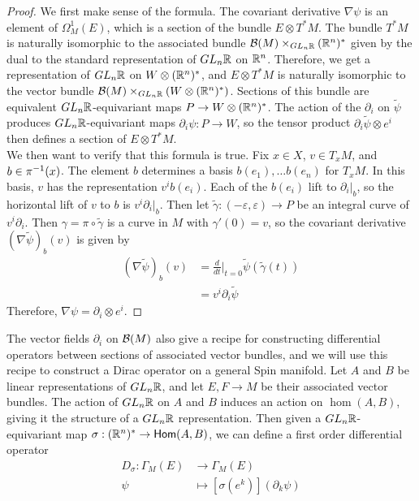 %
\begin{proof}
 We first make sense of the formula. The covariant derivative $\nabla\psi$ is
 an element of $\Omega_M^1(E)$, which is a section of the bundle $E \otimes T^*M$.
 The bundle $T^*M$ is naturally isomorphic to the associated bundle
 $\mathcal{B}(M) \times_{GL_n\mathbb{R}} (\mathbb{R}^n)^*$ given by the dual to the standard representation
 of $GL_n\mathbb{R}$ on $\mathbb{R}^n$. Therefore, we get a representation of $GL_n\mathbb{R}$ on
 $W \otimes (\mathbb{R}^n)^*$, and $E \otimes T^*M$ is naturally isomorphic to the vector
 bundle $\mathcal{B}(M) \times_{GL_n\mathbb{R}} (W \otimes (\mathbb{R}^n)^*)$. Sections of this bundle
 are equivalent $GL_n\mathbb{R}$-equivariant maps $P \to W \otimes (\mathbb{R}^n)^*$. The action
 of the $\partial_i$ on $\tilde{\psi}$ produces $GL_n\mathbb{R}$-equivariant maps
 $\partial_i\psi : P \to W$, so the tensor product
 $\partial_i\tilde{\psi} \otimes e^i$ then defines a section of $E \otimes T^*M$. \\

 We then want to verify that this formula is true. Fix $x \in X$, $v \in T_xM$,
 and $b \in \pi^{-1}(x)$. The element $b$ determines a basis $b(e_1), \ldots b(e_n)$
 for $T_xM$. In this basis, $v$ has the representation $v^ib(e_i)$. Each
 of the $b(e_i)$ lift to $\partial_i\vert_b$, so the horizontal lift of $v$ to $b$
 is $v^i\partial_i\vert_b$. Then let
 $\tilde{\gamma} : (-\varepsilon, \varepsilon) \to P$ be an integral curve of
 $v^i\partial_i$. Then $\gamma = \pi \circ \tilde{\gamma}$ is a curve in $M$
 with $\gamma'(0) = v$, so the covariant derivative $(\nabla\tilde{\psi})_b(v)$ is
 given by
 \begin{align*}
  (\nabla\tilde{\psi})_b(v) & = \frac{d}{dt}\bigg\vert_{t=0}
  \tilde{\psi}(\tilde{\gamma}(t)) \\
                            & = v^i\partial_i\tilde{\psi}
 \end{align*}
 Therefore, $\nabla\psi = \partial_i \otimes e^i$.
\end{proof}
%
The vector fields $\partial_i$ on $\mathcal{B}(M)$ also give a recipe for constructing
differential operators between sections of associated vector bundles,
and we will use this recipe to construct a Dirac operator on a general Spin
manifold. Let $A$ and $B$ be linear representations of $GL_n\mathbb{R}$, and let
$E,F \to M$ be their associated vector bundles. The action of $GL_n\mathbb{R}$ on
$A$ and $B$ induces an action on $\hom(A,B)$, giving it the structure
of a $GL_n\mathbb{R}$ representation. Then given a $GL_n\mathbb{R}$-equivariant map
$\sigma : (\mathbb{R}^n)^* \to \mathsf{Hom}(A,B)$, we can define a first order differential
operator
\begin{align*}
 D_\sigma : \Gamma_M(E) & \to \Gamma_M(E)                       \\
 \psi                   & \mapsto [\sigma(e^k)](\partial_k\psi)
\end{align*}
